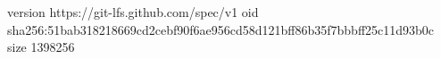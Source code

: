 version https://git-lfs.github.com/spec/v1
oid sha256:51bab318218669cd2cebf90f6ae956cd58d121bff86b35f7bbbff25c11d93b0c
size 1398256
